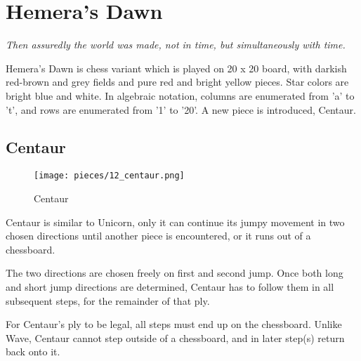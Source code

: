 

\chapter*{Hemera's Dawn}

\begin{flushright}
\parbox{0.8\textwidth}{
\emph{Then assuredly the world was made, not in time, but simultaneously with time. \\
 } }
\end{flushright}

\noindent
Hemera's Dawn is chess variant which is played on 20 x 20 board, with
darkish red-brown and grey fields and pure red and bright yellow pieces.
Star colors are bright blue and white. In algebraic notation, columns
are enumerated from 'a' to 't', and rows are enumerated from '1' to '20'.
A new piece is introduced, Centaur.

\clearpage %

\section*{Centaur}

\noindent
\begin{wrapfigure}[11]{l}{0.4\textwidth}
\centering
\texttt{[image: pieces/12\_centaur.png]}
\caption{Centaur}
\label{fig:12_centaur}
\end{wrapfigure}
Centaur is similar to Unicorn, only it can continue its jumpy movement
in two chosen directions until another piece is encountered, or it runs
out of a chessboard.

The two directions are chosen freely on first and second jump. Once both
long and short jump directions are determined, Centaur has to follow them
in all subsequent steps, for the remainder of that ply.

For Centaur's ply to be legal, all steps must end up on the chessboard.
Unlike Wave, Centaur cannot step outside of a chessboard, and in later
step(s) return back onto it.

